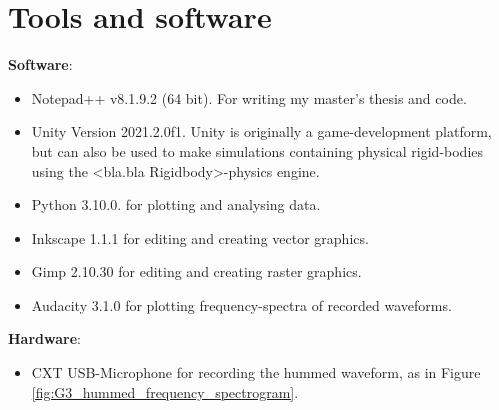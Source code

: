 \chapter{Tools and software}
	
	\textbf{Software}:
	\begin{itemize}
		\item Notepad++ v8.1.9.2 (64 bit). For writing my master's thesis and code.
		
		\item Unity Version 2021.2.0f1. Unity is originally a game-development platform, but can also be used to make  simulations containing physical rigid-bodies using the <bla.bla Rigidbody>-physics engine.
		
		\item Python 3.10.0. for plotting and analysing data.
		
		\item Inkscape 1.1.1 for editing and creating vector graphics.
		
		\item Gimp 2.10.30 for editing and creating raster graphics.
		
		\item Audacity 3.1.0 for plotting frequency-spectra of recorded waveforms.
	\end{itemize}
	
	\textbf{Hardware}:
	\begin{itemize}
		\item CXT USB-Microphone for recording the hummed waveform, as in Figure \ref{fig:G3_hummed_frequency_spectrogram}.
	\end{itemize}
	